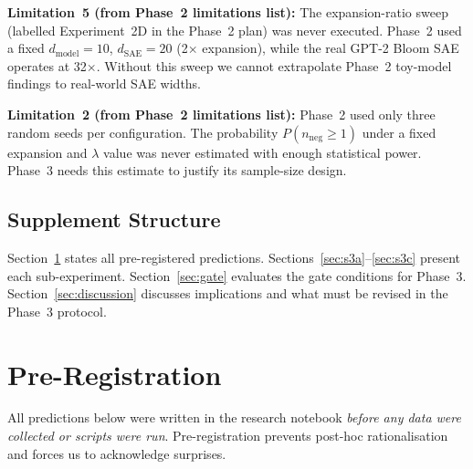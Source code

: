 \documentclass[11pt,a4paper]{article}
\newcommand{\nneg}{n_{\mathrm{neg}}}
\begin{document}
\begin{limitation}
\textbf{Limitation~5 (from Phase~2 limitations list):} The expansion-ratio sweep
(labelled Experiment~2D in the Phase~2 plan) was never executed.  Phase~2 used a
fixed $d_{\mathrm{model}}{=}10$, $d_{\mathrm{SAE}}{=}20$ (2$\times$ expansion),
while the real GPT-2 Bloom SAE operates at 32$\times$.  Without this sweep we cannot
extrapolate Phase~2 toy-model findings to real-world SAE widths.
\end{limitation}

\begin{limitation}
\textbf{Limitation~2 (from Phase~2 limitations list):} Phase~2 used only three random
seeds per configuration.  The probability $P(\nneg \ge 1)$ under a fixed expansion
and $\lambda$ value was never estimated with enough statistical power.
Phase~3 needs this estimate to justify its sample-size design.
\end{limitation}

\subsection{Supplement Structure}

Section~\ref{sec:prereg} states all pre-registered predictions.
Sections~\ref{sec:s3a}--\ref{sec:s3c} present each sub-experiment.
Section~\ref{sec:gate} evaluates the gate conditions for Phase~3.
Section~\ref{sec:discussion} discusses implications and what must be
revised in the Phase~3 protocol.

\section{Pre-Registration}
\label{sec:prereg}

All predictions below were written in the research notebook \emph{before any data were
collected or scripts were run}.  Pre-registration prevents post-hoc rationalisation
and forces us to acknowledge surprises.
\end{document}
